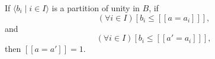 If $\langle b_i \mid i \in I \rangle$ is a partition of unity in $B$, if
$$(\forall i \in I)[b_i \leq [\![a = a_i]\!]],$$
and
$$(\forall i \in I)[b_i \leq [\![a' = a_i]\!]],$$
then $[\![a = a']\!] = 1$.
